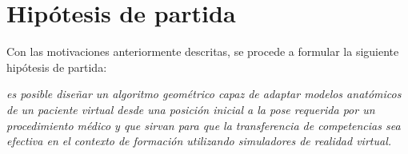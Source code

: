 \section{Hipótesis de partida} 
\label{intro:hipotesis}
Con las motivaciones anteriormente descritas, se procede a formular la siguiente hipótesis de partida:




\emph{es posible diseñar un algoritmo geométrico capaz de adaptar modelos anatómicos de un paciente virtual desde una posición inicial a la pose requerida por un procedimiento médico y que sirvan para que la transferencia de competencias sea efectiva en el contexto de formación utilizando simuladores de realidad virtual. }



